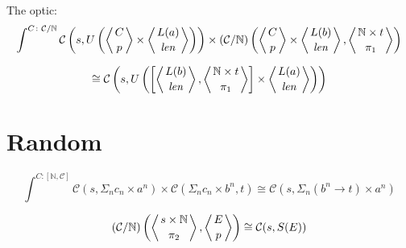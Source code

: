 \documentclass[11pt]{amsart}
\begin{document}
The optic:
\[ \int^{C \colon \mathcal{C}/\mathbb{N}} \mathcal{C} 
\left(s, U\left( 
  \left \langle {C \atop p} \right \rangle \times \left \langle {L(a) \atop \mathit{len}} \right \rangle \right) \right)  
  \times (\mathcal{C}/\mathbb{N})\left( \left \langle {C \atop p} \right \rangle 
  \times \left \langle {L(b) \atop \mathit{len}} \right \rangle, \left \langle {\mathbb{N} \times t \atop \pi_1} \right \rangle \right) \]
  
\[ \cong \mathcal{C} \left(  s, U\left( 
  \left[ \left \langle {L(b) \atop \mathit{len}} \right \rangle, \left \langle {\mathbb{N} \times t \atop \pi_1} \right \rangle \right] \times \left \langle {L(a) \atop \mathit{len}} \right \rangle \right) \right) \]
  
\section{Random}

\[ \int^{C : [\mathbb{N}, \mathcal{C}]} \mathcal{C}(s, \Sigma_n c_n \times a^n) \times  \mathcal{C}(\Sigma_n c_n \times b^n, t) \cong \mathcal{C}\left( s, \Sigma_n (b^n \to t) \times a^n \right)\]

\[(\mathcal{C}/\mathbb{N}) \left( \left \langle {s\times \mathbb{N} \atop \pi_2} \right \rangle , \left \langle {E \atop p } \right \rangle \right) \cong \mathcal{C} (s, S(E)) \]
\end{document}
